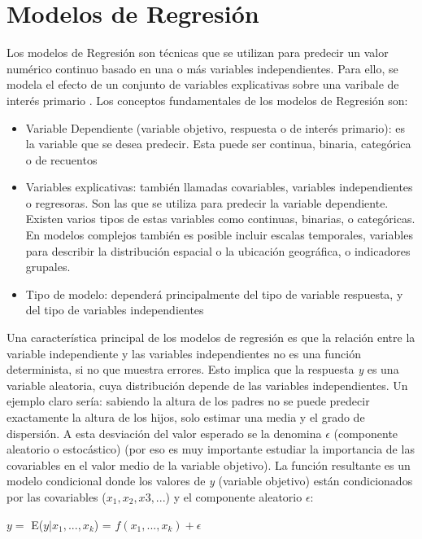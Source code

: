 \documentclass[12pt,a4paper,Spanish]{book}
\begin{document}
\section{Modelos de Regresión}
Los modelos de Regresión son técnicas que se utilizan para predecir un valor numérico continuo basado en una o más variables independientes. Para ello, se modela el efecto de un conjunto de variables explicativas sobre una varibale de interés primario \autocite{fahrmeir2013regression}.
\newline
Los conceptos fundamentales de los modelos de Regresión son:
\begin{itemize}
	\item Variable Dependiente (variable objetivo, respuesta o de interés primario): es la variable que se desea predecir. Esta puede ser continua, binaria, categórica o de recuentos
	\item Variables explicativas: también llamadas covariables, variables independientes o regresoras. Son las que se utiliza para predecir la variable dependiente. Existen varios tipos de estas variables como continuas, binarias,	o categóricas. En modelos complejos también es posible incluir escalas temporales, variables para describir la distribución espacial o la ubicación geográfica, o indicadores grupales.
	\item Tipo de modelo: dependerá principalmente del tipo de variable respuesta, y del tipo de variables independientes
\end{itemize}
Una característica principal de los modelos de regresión es que la relación entre la variable independiente y las variables independientes no es una función determinista, si no que muestra errores. Esto implica que la respuesta \textit{y} es una variable aleatoria, cuya distribución depende de las variables independientes. Un ejemplo claro sería: sabiendo la altura de los padres no se puede predecir exactamente la altura de los hijos, solo estimar una media y el grado de dispersión. A esta desviación del valor esperado se la denomina $\epsilon$ (componente aleatorio o estocástico) (por eso es muy importante estudiar la importancia de las covariables en el valor medio de la variable objetivo). La función resultante es un modelo condicional donde los valores de \textit{y} (variable objetivo) están condicionados por las covariables ($x_1, x_2, x3, ...$) y el componente aleatorio $\epsilon$:
\begin{center}
	$y = $
	E($y|x_1, ..., x_k$) = $f(x_1, ..., x_k) + \epsilon $
\end{center}
\end{document}
